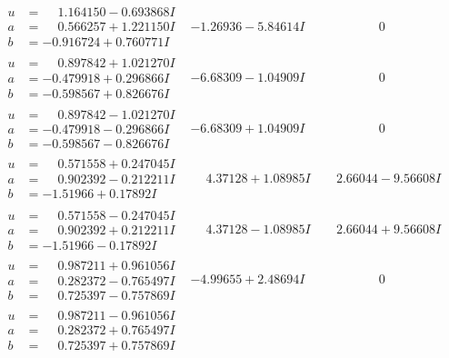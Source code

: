 \documentclass[1p]{elsarticle_modified}
\theoremstyle{definition}
\begin{document}
$$\begin{array}{c|c|c}
\begin{aligned}
u &= \phantom{-}1.164150 - 0.693868 I \\
a &= \phantom{-}0.566257 + 1.221150 I \\
b &= -0.916724 + 0.760771 I\end{aligned}
 & -1.26936 - 5.84614 I & \phantom{-0.000000 } 0 \\ \hline\begin{aligned}
u &= \phantom{-}0.897842 + 1.021270 I \\
a &= -0.479918 + 0.296866 I \\
b &= -0.598567 + 0.826676 I\end{aligned}
 & -6.68309 - 1.04909 I & \phantom{-0.000000 } 0 \\ \hline\begin{aligned}
u &= \phantom{-}0.897842 - 1.021270 I \\
a &= -0.479918 - 0.296866 I \\
b &= -0.598567 - 0.826676 I\end{aligned}
 & -6.68309 + 1.04909 I & \phantom{-0.000000 } 0 \\ \hline\begin{aligned}
u &= \phantom{-}0.571558 + 0.247045 I \\
a &= \phantom{-}0.902392 - 0.212211 I \\
b &= -1.51966 + 0.17892 I\end{aligned}
 & \phantom{-}4.37128 + 1.08985 I & \phantom{-}2.66044 - 9.56608 I \\ \hline\begin{aligned}
u &= \phantom{-}0.571558 - 0.247045 I \\
a &= \phantom{-}0.902392 + 0.212211 I \\
b &= -1.51966 - 0.17892 I\end{aligned}
 & \phantom{-}4.37128 - 1.08985 I & \phantom{-}2.66044 + 9.56608 I \\ \hline\begin{aligned}
u &= \phantom{-}0.987211 + 0.961056 I \\
a &= \phantom{-}0.282372 - 0.765497 I \\
b &= \phantom{-}0.725397 - 0.757869 I\end{aligned}
 & -4.99655 + 2.48694 I & \phantom{-0.000000 } 0 \\ \hline\begin{aligned}
u &= \phantom{-}0.987211 - 0.961056 I \\
a &= \phantom{-}0.282372 + 0.765497 I \\
b &= \phantom{-}0.725397 + 0.757869 I\end{aligned}

\end{array}$$
\end{document}
